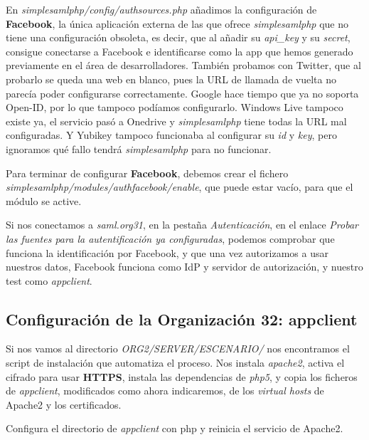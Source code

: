 \documentclass[]{article}
\begin{document}
En \textit{simplesamlphp/config/authsources.php} añadimos la configuración de \textbf{Facebook}, la única aplicación externa de las que ofrece \textit{simplesamlphp} que no tiene una configuración obsoleta, es decir, que al añadir su \textit{api\_key} y su \textit{secret}, consigue conectarse a Facebook e identificarse como la app que hemos generado previamente en el área de desarrolladores. También probamos con Twitter, que al probarlo se queda una web en blanco, pues la URL de llamada de vuelta no parecía poder configurarse correctamente. Google hace tiempo que ya no soporta Open-ID, por lo que tampoco podíamos configurarlo. Windows Live tampoco existe ya, el servicio pasó a Onedrive y \textit{simplesamlphp} tiene todas la URL mal configuradas. Y Yubikey tampoco funcionaba al configurar su \textit{id} y \textit{key}, pero ignoramos qué fallo tendrá \textit{simplesamlphp} para no funcionar.

\hfill

Para terminar de configurar \textbf{Facebook}, debemos crear el fichero \textit{simplesamlphp/modules/authfacebook/enable}, que puede estar vacío, para que el módulo se active.

\hfill

Si nos conectamos a \textit{saml.org31}, en la pestaña \textit{Autenticación}, en el enlace \textit{Probar las fuentes para la autentificación ya configuradas}, podemos comprobar que funciona la identificación por Facebook, y que una vez autorizamos a usar nuestros datos, Facebook funciona como IdP y servidor de autorización, y nuestro test como \textit{appclient}.










\subsection{Configuración de la Organización 32: appclient}


Si nos vamos al directorio \textit{ORG2/SERVER/ESCENARIO/} nos encontramos el script de instalación que automatiza el proceso. Nos instala \textit{apache2}, activa el cifrado para usar \textbf{HTTPS}, instala las dependencias de \textit{php5}, y copia los ficheros de \textit{appclient}, modificados como ahora indicaremos, de los \textit{virtual hosts} de Apache2 y los certificados.

Configura el directorio de \textit{appclient} con php y reinicia el servicio de Apache2.
\end{document}

